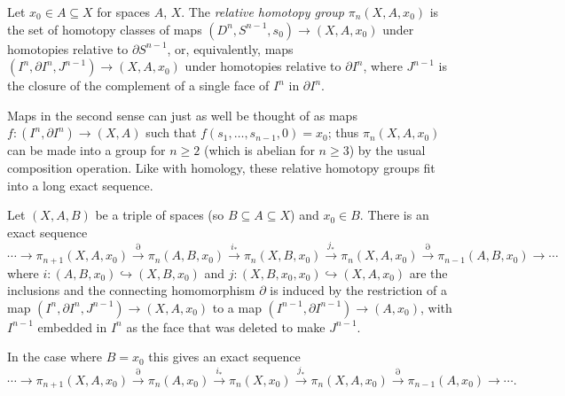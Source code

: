 \documentclass[10pt]{article}
\providecommand{\vocab}[1]{{{\sffamily\textit{#1}}}}
\begin{document}
\begin{definition}
    \label{def:relative-homotopy-group}
    Let $x_0\in A\subseteq X$ for spaces $A$, $X$.
    The \vocab{relative homotopy group} $\pi_n(X,A,x_0)$
    is the set of homotopy classes of maps
    $(D^n, S^{n-1}, s_0)\to(X,A,x_0)$
    under homotopies relative to $\partial S^{n-1}$, or, equivalently,
    maps $(I^n,\partial I^n,J^{n-1})\to(X,A,x_0)$
    under homotopies relative to $\partial I^n$, where $J^{n-1}$
    is the closure of the complement of a single face
    of $I^n$ in $\partial I^n$.
\end{definition}

Maps in the second sense can just as well be thought of as maps
$f\colon(I^n,\partial I^n)\to(X,A)$
such that $f(s_1,\dots,s_{n-1},0) = x_0$;
thus $\pi_n(X,A,x_0)$ can be made into a group for $n\ge 2$
(which is abelian for $n\ge 3$) by the usual composition operation.
Like with homology, these relative homotopy groups
fit into a long exact sequence.

\begin{prop}
    \label{prop:homotopy-long-exact-sequence}
    Let $(X,A,B)$ be a triple of spaces
    (so $B\subseteq A\subseteq X$) and $x_0\in B$.
    There is an exact sequence
    \begin{equation*}
	\cdots\to\pi_{n+1}(X,A,x_0)
	\stackrel\partial\to\pi_n(A,B,x_0)\stackrel{i_*}\to\pi_n(X,B,x_0)
	\stackrel{j_*}\to\pi_n(X,A,x_0)
	\stackrel\partial\to\pi_{n-1}(A,B,x_0)\to\cdots
    \end{equation*}
    where $i\colon(A,B,x_0)\hookrightarrow(X,B,x_0)$
    and $j\colon(X,B,x_0,x_0)\hookrightarrow(X,A,x_0)$
    are the inclusions and the connecting homomorphism
    $\partial$ is induced by the restriction
    of a map $(I^n,\partial I^n, J^{n-1})\to(X,A,x_0)$
    to a map $(I^{n-1},\partial I^{n-1})\to(A,x_0)$,
    with $I^{n-1}$ embedded in $I^n$ as the face
    that was deleted to make $J^{n-1}$.
\end{prop}

In the case where $B = x_0$ this gives an exact sequence
\begin{equation*}
    \cdots\to\pi_{n+1}(X,A,x_0)
    \stackrel\partial\to\pi_n(A,x_0)\stackrel{i_*}\to\pi_n(X,x_0)
    \stackrel{j_*}\to\pi_n(X,A,x_0)
    \stackrel\partial\to\pi_{n-1}(A,x_0)\to\cdots.
\end{equation*}
\end{document}
